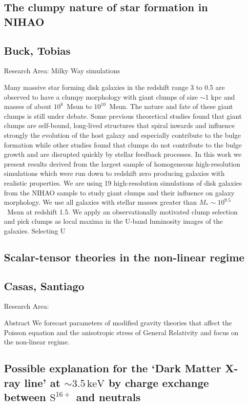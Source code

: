 \subsection*{\centering \large The clumpy nature of star formation in NIHAO}
\subsection*{\centering \normalsize Buck, Tobias}
Research Area: Milky Way simulations\newline

\noindent Many massive star forming disk galaxies in the redshift range 3 to 0.5 are observed to have a clumpy morphology with giant clumps of size $\sim$1 kpc and masses of about $10^8$~Msun to $10^{10}$~Msun. The nature and fate of these giant clumps is still under debate. Some previous theoretical studies found that giant clumps are self-bound, long-lived structures that spiral inwards and influence strongly the evolution of the host galaxy and especially contribute to the bulge formation while other studies found that clumps do not contribute to the bulge growth and are disrupted quickly by stellar feedback processes. In this work we present results derived from the largest sample of homogeneous high-resolution simulations which were run down to redshift zero producing galaxies with realistic properties. We are using 19 high-resolution simulations of disk galaxies from the NIHAO sample to study giant clumps and their influence on galaxy morphology. We use all galaxies with stellar masses greater than $M_{*}\sim10^{9.5}$~Msun at redshift 1.5. We apply an observationally motivated clump selection and pick clumps as local maxima in the U-band luminosity images of the galaxies. Selecting U
\newpage
\subsection*{\centering \large Scalar-tensor theories in the non-linear regime}
\subsection*{\centering \normalsize Casas, Santiago}
Research Area: \newline

\noindent Abstract We forecast parameters of modified gravity theories that affect the Poisson equation and the anisotropic stress of General Relativity and focus on the non-linear regime.

\newpage
\subsection*{\centering \large Possible explanation for the `Dark Matter X-ray line' at $\sim 3.5\,\mathrm{keV}$ by
charge exchange between  $\mathrm{S}^{16+}$ and neutrals}
